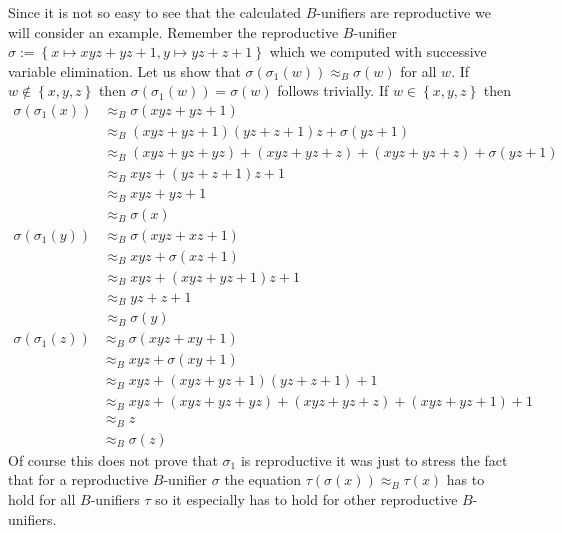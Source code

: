 		Since it is not so easy to see that the calculated $B$-unifiers are reproductive we will consider an example.
		Remember the reproductive $B$-unifier $\sigma:=\left\lbrace x\mapsto xyz+yz+1,y\mapsto yz+z+1\right\rbrace$ which we computed with successive variable elimination. Let us show that $\sigma(\sigma_1(w))\approx_B\sigma(w)$ for all $w$. If $w\notin\left\lbrace x,y,z\right\rbrace $ then $\sigma(\sigma_1(w))=\sigma(w)$ follows trivially. If $w\in\left\lbrace x,y,z\right\rbrace $ then
		\begin{align*}
		\sigma(\sigma_1(x))&\approx_B\sigma(xyz+yz+1)\\
		&\approx_B(xyz+yz+1)(yz+z+1)z+\sigma(yz+1)\\
		&\approx_B(xyz+yz+yz)+(xyz+yz+z)+(xyz+yz+z)+\sigma(yz+1)\\
		&\approx_Bxyz+(yz+z+1)z+1\\
		&\approx_Bxyz+yz+1\\
		&\approx_B\sigma(x)\\
		\sigma(\sigma_1(y))&\approx_B\sigma(xyz+xz+1)\\
		&\approx_Bxyz+\sigma(xz+1)\\
		&\approx_Bxyz+(xyz+yz+1)z+1\\
		&\approx_Byz+z+1\\
		&\approx_B\sigma(y)
		\end{align*}
		\begin{align*}
		\sigma(\sigma_1(z))&\approx_B\sigma(xyz+xy+1)\\
		&\approx_Bxyz+\sigma(xy+1)\\
		&\approx_Bxyz+(xyz+yz+1)(yz+z+1)+1\\
		&\approx_Bxyz+(xyz+yz+yz)+(xyz+yz+z)+(xyz+yz+1)+1\\
		&\approx_Bz\\
		&\approx_B\sigma(z)
		\end{align*}
		Of course this does not prove that $\sigma_1$ is reproductive it was just to stress the fact that for a reproductive $B$-unifier $\sigma$ the equation $\tau(\sigma(x))\approx_B\tau(x)$ has to hold for all $B$-unifiers $\tau$ so it especially has to hold for other reproductive $B$-unifiers.
